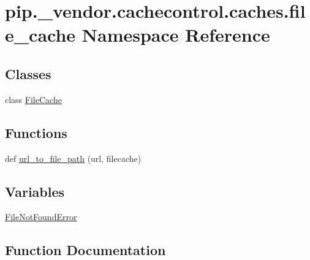 \hypertarget{namespacepip_1_1__vendor_1_1cachecontrol_1_1caches_1_1file__cache}{}\section{pip.\+\_\+vendor.\+cachecontrol.\+caches.\+file\+\_\+cache Namespace Reference}
\label{namespacepip_1_1__vendor_1_1cachecontrol_1_1caches_1_1file__cache}
\subsection*{Classes}
\begin{DoxyCompactItemize}
\item 
class \hyperlink{classpip_1_1__vendor_1_1cachecontrol_1_1caches_1_1file__cache_1_1FileCache}{File\+Cache}
\end{DoxyCompactItemize}
\subsection*{Functions}
\begin{DoxyCompactItemize}
\item 
def \hyperlink{namespacepip_1_1__vendor_1_1cachecontrol_1_1caches_1_1file__cache_a940b24a11bee81edb3cad70ff8efc25d}{url\+\_\+to\+\_\+file\+\_\+path} (url, filecache)
\end{DoxyCompactItemize}
\subsection*{Variables}
\begin{DoxyCompactItemize}
\item 
\hyperlink{namespacepip_1_1__vendor_1_1cachecontrol_1_1caches_1_1file__cache_a8f1e09e84a2069f0b4aa01fbd5b0906a}{File\+Not\+Found\+Error}
\end{DoxyCompactItemize}


\subsection{Function Documentation}
\mbox{\label{namespacepip_1_1__vendor_1_1cachecontrol_1_1caches_1_1file__cache_a940b24a11bee81edb3cad70ff8efc25d}} 
